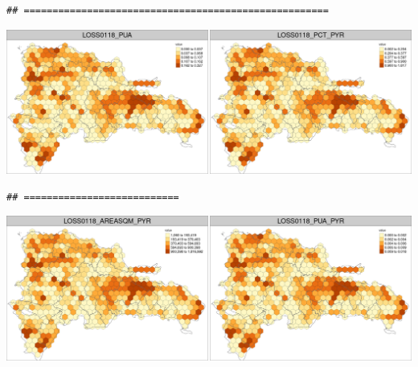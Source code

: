 \documentclass[10pt,landscape,a3paper]{article}
\begin{document}
\begin{verbatim}
## =====================================================
\end{verbatim}

\begin{center}\includegraphics{img/data-download-preparation-eda/zonal-long-term-grid-8} \end{center}

\begin{verbatim}
## ===========================
\end{verbatim}

\begin{center}\includegraphics{img/data-download-preparation-eda/zonal-long-term-grid-9} \end{center}
\end{document}
